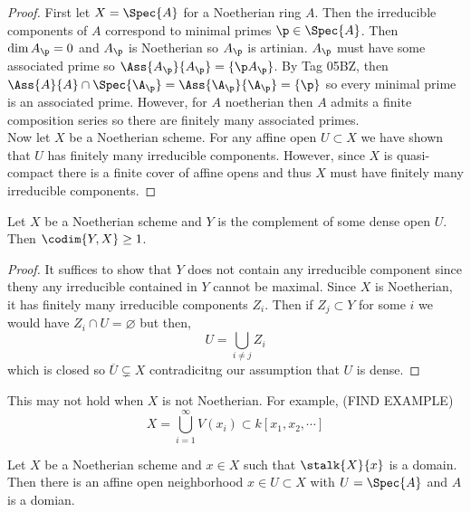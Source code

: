 \documentclass[12pt]{article}
\begin{document}
\begin{proof}
First let $X = \Spec{A}$ for a Noetherian ring $A$. Then the irreducible components of $A$ correspond to minimal primes $\p \in \Spec{A}$. Then $\dim{A_\p} = 0$ and $A_\p$ is Noetherian so $A_\p$ is artinian. $A_\p$ must have some associated prime so $\Ass{A_\p}{A_\p} = \{ \p A_\p \}$.  By Tag 05BZ, then $\Ass{A}{A} \cap \Spec{\A_\p} = \Ass{\A_\p}{\A_\p} = \{ \p \}$ so every minimal prime is an associated prime. However, for $A$ noetherian then $A$ admits a finite composition series so there are finitely many associated primes.
\bigskip\\
Now let $X$ be a Noetherian scheme. For any affine open $U \subset X$ we have shown that $U$ has finitely many irreducible components. However, since $X$ is quasi-compact there is a finite cover of affine opens and thus $X$ must have finitely many irreducible components. 
\end{proof}

\begin{lemma}
Let $X$ be a Noetherian scheme and $Y$ is the complement of some dense open $U$. Then $\codim{Y, X} \ge 1$.
\end{lemma}

\begin{proof}
It suffices to show that $Y$ does not contain any irreducible component since theny any irreducible contained in $Y$ cannot be maximal. Since $X$ is Noetherian, it has finitely many irreducible components $Z_i$. Then if $Z_j \subset Y$ for some $i$ we would have $Z_i \cap U = \varnothing$ but then,
\[ U = \bigcup_{i \neq j} Z_i \]
which is closed so $\overline{U} \subsetneq X$ contradicitng our assumption that $U$ is dense.
\end{proof}

\begin{example}
This may not hold when $X$ is not Noetherian. For example, (FIND EXAMPLE)
\[ X = \bigcup_{i = 1}^\infty V(x_i) \subset k[x_1, x_2, \cdots] \] 
\end{example}

\begin{lemma} \label{open_domain}
Let $X$ be a Noetherian scheme and $x \in X$ such that $\stalk{X}{x}$ is a domain. Then there is an affine open neighborhood $x \in U \subset X$ with $U = \Spec{A}$ and $A$ is a domian.
\end{lemma}
\end{document}
